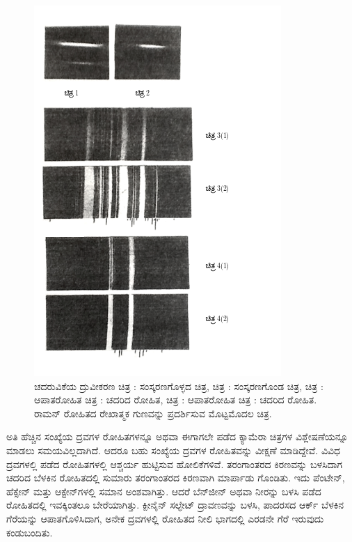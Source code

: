 \begin{figure}[!hb]
\centering
\includegraphics[scale=0.64]{"images/12.png"}
\caption{ಚದರುವಿಕೆಯ ದ್ರುವೀಕರಣ ಚಿತ್ರ \textbf{}: ಸಂಸ್ಕರಣಗೊಳ್ಳದ ಚಿತ್ರ, ಚಿತ್ರ \textbf{}: ಸಂಸ್ಕರಣಗೊಂಡ ಚಿತ್ರ, ಚಿತ್ರ \textbf{}: ಆಪಾತರೋಹಿತ ಚಿತ್ರ \textbf{}: ಚದರಿದ ರೋಹಿತ, ಚಿತ್ರ \textbf{}: ಆಪಾತರೋಹಿತ ಚಿತ್ರ \textbf{}: ಚದರಿದ ರೋಹಿತ. ರಾಮನ್ ರೋಹಿತದ  ರೇಖಾತ್ಮಕ ಗುಣವನ್ನು ಪ್ರದರ್ಶಿಸುವ ಮೊಟ್ಟಮೊದಲ ಚಿತ್ರ.}\label{chap5-fig07}
\end{figure}

ಅತಿ ಹೆಚ್ಚಿನ ಸಂಖ್ಯೆಯ ದ್ರವಗಳ ರೋಹಿತಗಳನ್ನೂ ಅಥವಾ ಈಗಾಗಲೇ ಪಡೆದ ಕ್ಯಾಮೆರಾ ಚಿತ್ರಗಳ ವಿಶ್ಲೇಷಣೆಯನ್ನೂ ಮಾಡಲು ಸಮಯವಿಲ್ಲದಾಗಿದೆ. ಆದರೂ ಬಹು ಸಂಖ್ಯೆಯ ದ್ರವಗಳ ರೋಹಿತವನ್ನು ವೀಕ್ಷಣೆ ಮಾಡಿದ್ದೇವೆ. ವಿವಿಧ ದ್ರವಗಳಲ್ಲಿ ಪಡೆದ ರೋಹಿತಗಳಲ್ಲಿ ಆಶ್ಚರ್ಯ ಹುಟ್ಟಿಸುವ ಹೋಲಿಕೆಗಳಿವೆ.  ತರಂಗಾಂತರದ ಕಿರಣವನ್ನು ಬಳಸಿದಾಗ ಚದರಿದ ಬೆಳಕಿನ ರೋಹಿತದಲ್ಲಿ ಸುಮಾರು  ತರಂಗಾಂತರದ ಕಿರಣವಾಗಿ ಮಾರ್ಪಾಡು ಗೊಂಡಿತು. ಇದು ಪೆಂಟೇನ್, ಹೆಕ್ಸೇನ್ ಮತ್ತು ಆಕ್ಟೇನ್‌ಗಳಲ್ಲಿ ಸಮಾನ ಅಂಶವಾಗಿತ್ತು. ಆದರೆ ಬೆನ್‍ಜೀನ್ ಅಥವಾ ನೀರನ್ನು ಬಳಸಿ ಪಡೆದ ರೋಹಿತದಲ್ಲಿ ಇವಕ್ಕಿಂತಲೂ ಬೇರೆಯಾಗಿತ್ತು. ಕ್ಪೀನೈನ್ ಸಲ್ಫೇಟ್ ದ್ರಾವಣವನ್ನು ಬಳಸಿ, ಪಾದರಸದ ಆರ್ಕ್ ಬೆಳಕಿನ  ಗೆರೆಯನ್ನು ಆಪಾತಗೊಳಿಸಿದಾಗ, ಅನೇಕ ದ್ರವಗಳಲ್ಲಿ ರೋಹಿತದ ನೀಲಿ ಭಾಗದಲ್ಲಿ ಎರಡನೇ ಗೆರೆ ಇರುವುದು ಕಂಡುಬಂದಿತು.

